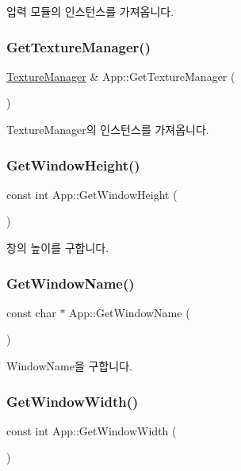 입력 모듈의 인스턴스를 가져옵니다. \mbox{\label{class_app_ade63fd2ae6ef0daf37a85329b93e3662}} 
\subsubsection{\texorpdfstring{GetTextureManager()}{GetTextureManager()}}
{\footnotesize\ttfamily \mbox{\hyperlink{class_texture_manager}{Texture\+Manager}} \& App\+::\+Get\+Texture\+Manager (\begin{DoxyParamCaption}{ }\end{DoxyParamCaption})}

Texture\+Manager의 인스턴스를 가져옵니다. \mbox{\label{class_app_a3b0f8f2b5f85a72589a12846594eaf6e}} 
\subsubsection{\texorpdfstring{GetWindowHeight()}{GetWindowHeight()}}
{\footnotesize\ttfamily const int App\+::\+Get\+Window\+Height (\begin{DoxyParamCaption}{ }\end{DoxyParamCaption})}

창의 높이를 구합니다. \mbox{\label{class_app_a1d70a48fa0c76a8404ba3b63f0ecab47}} 
\subsubsection{\texorpdfstring{GetWindowName()}{GetWindowName()}}
{\footnotesize\ttfamily const char $\ast$ App\+::\+Get\+Window\+Name (\begin{DoxyParamCaption}{ }\end{DoxyParamCaption})}

Window\+Name을 구합니다. \mbox{\label{class_app_ad88558728f682ef1a479928b0f0dc89f}} 
\subsubsection{\texorpdfstring{GetWindowWidth()}{GetWindowWidth()}}
{\footnotesize\ttfamily const int App\+::\+Get\+Window\+Width (\begin{DoxyParamCaption}{ }\end{DoxyParamCaption})}

